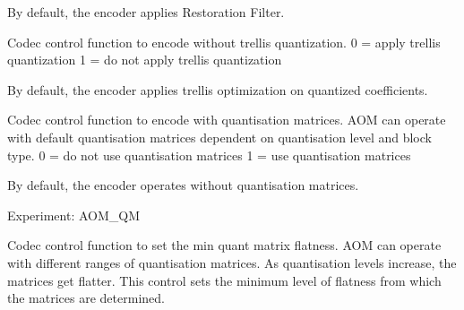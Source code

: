 \begin{Desc}
\begin{description}
By default, the encoder applies Restoration Filter. \item[{\em 
A\+V1\+E\+\_\+\+S\+E\+T\+\_\+\+D\+I\+S\+A\+B\+L\+E\+\_\+\+T\+R\+E\+L\+L\+I\+S\+\_\+\+Q\+U\+A\+NT\hypertarget{group__aom__encoder_ggae78dde67a6d78f332e9bdba0dde42db5a374b5581d0b68d5f8cc3e3f73495cfbb}{}\label{group__aom__encoder_ggae78dde67a6d78f332e9bdba0dde42db5a374b5581d0b68d5f8cc3e3f73495cfbb}
}]Codec control function to encode without trellis quantization. 0 = apply trellis quantization 1 = do not apply trellis quantization

By default, the encoder applies trellis optimization on quantized coefficients. \item[{\em 
A\+V1\+E\+\_\+\+S\+E\+T\+\_\+\+E\+N\+A\+B\+L\+E\+\_\+\+QM\hypertarget{group__aom__encoder_ggae78dde67a6d78f332e9bdba0dde42db5ae63993934cdc5aa36efeec4df87a577e}{}\label{group__aom__encoder_ggae78dde67a6d78f332e9bdba0dde42db5ae63993934cdc5aa36efeec4df87a577e}
}]Codec control function to encode with quantisation matrices. A\+OM can operate with default quantisation matrices dependent on quantisation level and block type. 0 = do not use quantisation matrices 1 = use quantisation matrices

By default, the encoder operates without quantisation matrices.

Experiment\+: A\+O\+M\+\_\+\+QM \item[{\em 
A\+V1\+E\+\_\+\+S\+E\+T\+\_\+\+Q\+M\+\_\+\+M\+IN\hypertarget{group__aom__encoder_ggae78dde67a6d78f332e9bdba0dde42db5ae611944ba148b6446d4387dd9b452917}{}\label{group__aom__encoder_ggae78dde67a6d78f332e9bdba0dde42db5ae611944ba148b6446d4387dd9b452917}
}]Codec control function to set the min quant matrix flatness. A\+OM can operate with different ranges of quantisation matrices. As quantisation levels increase, the matrices get flatter. This control sets the minimum level of flatness from which the matrices are determined.


\end{description}
\end{Desc}

